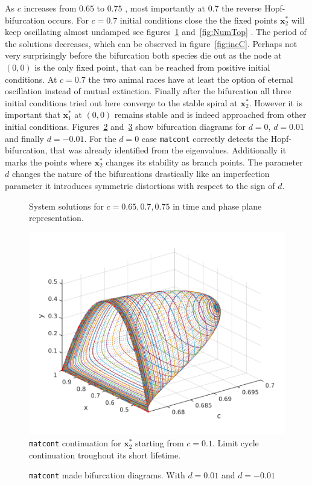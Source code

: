 As $c$ increases from $0.65$ to $0.75$ , most importantly at $0.7$ the reverse Hopf-bifurcation occurs. For $c = 0.7$ initial conditions close the the fixed points $\mathbf{x}_2^*$ will keep oscillating almost undamped see figures~\ref{[fig:incC]} and~\ref{fig:NumTop} . The period of the solutions decreases, which can be observed in figure~\ref{fig:incC}. Perhaps not very surprisingly before the bifurcation both species die out as the node at $(0,0)$ is the only fixed point, that can be reached from positive initial conditions. At $c = 0.7$ the two animal races have at least the option of eternal oscillation instead of mutual extinction. Finally after the bifurcation all three initial conditions tried out here converge to the stable spiral at $\mathbf{x}_2^*$. However it is important that $\mathbf{x}_1^*$ at $(0,0)$ remains stable and is indeed approached from other initial conditions. Figures~\ref{fig:matcontdeq0} and~\ref{fig:matcontdne0} show bifurcation diagrams for $d = 0$, $d = 0.01$ and finally $d = -0.01$. For the $d = 0$ case \texttt{matcont} correctly detects the Hopf-bifurcation, that was already identified from the eigenvalues. Additionally it marks the points where $\mathbf{x}_2^*$ changes its stability as branch points. The parameter $d$ changes the nature of the bifurcations drastically like an imperfection parameter it introduces symmetric distortions with respect to the sign of $d$.


\begin{figure}
\centering






\caption{System solutions for $c = 0.65, 0.7, 0.75$ in time and phase plane representation.}
\label{[fig:incC]}
\end{figure}

\begin{figure}

\includegraphics[scale=0.6]{./plots/hcCont.pdf}
\caption{\texttt{matcont} continuation for $\mathbf{x}_2^*$ starting from $c=0.1$. Limit cycle continuation troughout its short lifetime.} 
\label{fig:matcontdeq0}
\end{figure}

\begin{figure}


\caption{\texttt{matcont} made bifurcation diagrams. With $d = 0.01$ and $d=-0.01$}
\label{fig:matcontdne0}
\end{figure}


